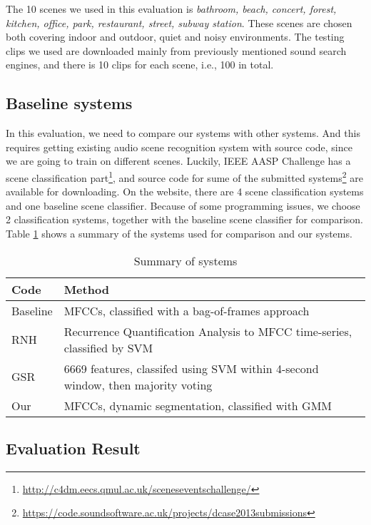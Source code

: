 The 10 scenes we used in this evaluation is \textit{bathroom, beach, concert, forest, kitchen, office, park, restaurant, street, subway station}. 
These scenes are chosen both covering indoor and outdoor, quiet and noisy environments. 
The testing clips we used are downloaded mainly from previously mentioned sound search engines, and there is 10 clips for each scene, i.e., 100 in total. 

\subsection{Baseline systems}
In this evaluation, we need to compare our systems with other systems. 
And this requires getting existing audio scene recognition system with source code, since we are going to train on different scenes. 
Luckily, IEEE AASP Challenge has a scene classification part\footnote{\url{http://c4dm.eecs.qmul.ac.uk/sceneseventschallenge/}}, and source code for sume of the submitted systems\footnote{\url{https://code.soundsoftware.ac.uk/projects/dcase2013submissions}} are available for downloading. 
On the website, there are 4 scene classification systems and one baseline scene classifier. 
Because of some programming issues, we choose 2 classification systems, together with the baseline scene classifier for comparison. 
Table \ref{table:systems} shows a summary of the systems used for comparison and our systems. 

\begin{table}[htb!]
\caption{Summary of systems}
\begin{tabular}{ll}
\toprule
 Code & Method \\
\bottomrule
 Baseline & MFCCs, classified with a bag-of-frames approach \\ 
 RNH & Recurrence Quantification Analysis to MFCC time-series, classified by SVM \\ 
 GSR & 6669 features, classifed using SVM within 4-second window, then majority voting \\
 Our & MFCCs, dynamic segmentation, classified with GMM \\ 
\bottomrule
\end{tabular}
\label{table:systems}
\end{table}

\subsection{Evaluation Result}

